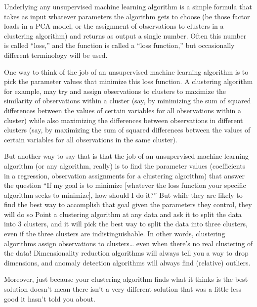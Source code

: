 \documentclass[letterpaper,10pt,english]{jupyterBook}
\begin{document}
\sphinxAtStartPar
Underlying any unsupervised machine learning algorithm is a simple formula that takes as input whatever parameters the algorithm gets to choose (be those factor loads in a PCA model, or the assignment of observations to clusters in a clustering algorithm) and returns as output a single number. Often this number is called “loss,” and the function is called a “loss function,” but occasionally different terminology will be used.

\sphinxAtStartPar
One way to think of the job of an unsupervised machine learning algorithm is to pick the parameter values that minimize this loss function. A clustering algorithm for example, may try and assign observations to clusters to maximize the similarity of observations within a cluster (say, by minimizing the sum of squared differences between the values of certain variables for all observations within a cluster) while also maximizing the differences between observations in different clusters (say, by maximizing the sum of squared differences between the values of certain variables for all observations  in the same cluster).

\sphinxAtStartPar
But another way to say that is that the job of an unsupervised machine learning algorithm (or any algorithm, really) is to find the parameter values (coefficients in a regression, observation assignments for a clustering algorithm) that answer the question “If my goal is to minimize {[}whatever the loss function your specific algorithm seeks to minimize{]}, how should I do it?” But while they are likely to find the best way to accomplish that goal given the parameters they control, they will do so  Point a clustering algorithm at any data and ask it to split the data into 3 clusters, and it will pick the best way to split the data into three clusters, even if the three clusters are  indistinguishable. In other words, clustering algorithms assign observations to clusters… even when there’s no real clustering of the data! Dimensionality reduction algorithms will always tell you a way to drop dimensions, and anomaly detection algorithms will always find (relative) outliers.

\sphinxAtStartPar
Moreover, just because your clustering algorithm finds what it thinks is the best solution doesn’t mean there isn’t a  very different solution that was  a little less good it hasn’t told you about.
\end{document}
